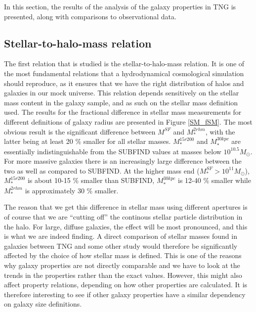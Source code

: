 In this section, the results of the analysis of the galaxy properties in TNG is presented, along with comparisons to observational data.

\subsection{Stellar-to-halo-mass relation}

The first relation that is studied is the stellar-to-halo-mass relation. It is one of the most fundamental relations that a hydrodynamical cosmological simulation should reproduce, as it ensures that we have the right distribution of halos and galaxies in our mock universe. This relation depends sensitively on the stellar mass content in the galaxy sample, and as such on the stellar mass definition used. The results for the fractional difference in stellar mass measurements for different definitions of galaxy radius are presented in Figure \ref{SM_fSM}. The most obvious result is the significant difference between $M^{SF}$ and $M_\ast^{2rhm}$, with the latter being at least 20 \% smaller for all stellar masses. $M_\ast^{15r200}$ and $M_\ast^{30kpc}$ are essentially indistinguishable from the SUBFIND values at masses below $10^{10.5} M_{\odot}$. For more massive galaxies there is an increasingly large difference between the two as well as compared to SUBFIND. At the higher mass end ($M^{SF}_\ast > 10^{11} M_{\odot}$), $M_\ast^{15r200}$ is about 10-15 \% smaller than SUBFIND, $M_\ast^{30kpc}$ is 12-40 \% smaller while $M_\ast^{2rhm}$ is approximately 30 \% smaller.


The reason that we get this difference in stellar mass using different apertures is of course that we are ``cutting off'' the continous stellar particle distribution in the halo. For large, diffuse galaxies, the effect will be most pronounced, and this is what we are indeed finding. A direct comparison of stellar masses found in galaxies between TNG and some other study would therefore be significantly affected by the choice of how stellar mass is defined. This is one of the reasons why galaxy properties are not directly comparable and we have to look at the trends in the properties rather than the exact values. However, this might also affect property relations, depending on how other properties are calculated. It is therefore interesting to see if other galaxy properties have a similar dependency on galaxy size definitions.

